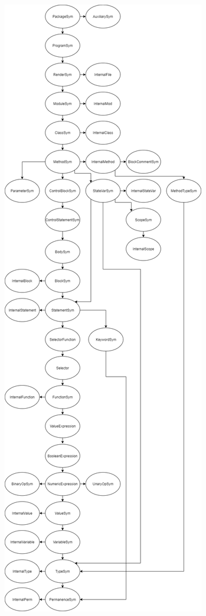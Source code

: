 \documentclass{beamer}
\begin{document}
\begin{frame}
\centering
\includegraphics[scale=0.12]{GOOLClasses.png}
\end{frame}
\end{document}
